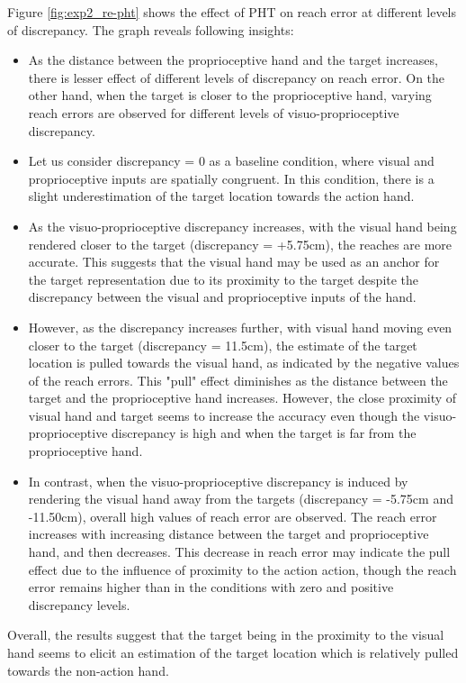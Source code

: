 Figure \ref{fig:exp2_re-pht} shows the effect of PHT on reach error at different levels of discrepancy. The graph reveals following insights:
\begin{itemize}

\item As the distance between the proprioceptive hand and the target increases, there is lesser effect of different levels of discrepancy on reach error. On the other hand, when the target is closer to the proprioceptive hand, varying reach errors are observed for different levels of visuo-proprioceptive discrepancy. 

\item Let us consider discrepancy = 0 as a baseline condition, where visual and proprioceptive inputs are spatially congruent. In this condition, there is a slight underestimation of the target location towards the action hand. 

\item As the visuo-proprioceptive discrepancy increases, with the visual hand being rendered closer to the target (discrepancy = +5.75cm), the reaches are more accurate. This suggests that the visual hand may be used as an anchor for the target representation due to its proximity to the target despite the discrepancy between the visual and proprioceptive inputs of the hand.

\item However, as the discrepancy increases further, with visual hand moving even closer to the target (discrepancy = 11.5cm), the estimate of the target location is pulled towards the visual hand, as indicated by the negative values of the reach errors. This "pull" effect diminishes as the distance between the target and the proprioceptive hand increases. However, the close proximity of visual hand and target seems to increase the accuracy even though the visuo-proprioceptive discrepancy is high and when the target is far from the proprioceptive hand.

\item In contrast, when the visuo-proprioceptive discrepancy is induced by rendering the visual hand away from the targets (discrepancy = -5.75cm and -11.50cm), overall high values of reach error are observed. The reach error increases with increasing distance between the target and proprioceptive hand, and then decreases. This decrease in reach error may indicate the pull effect due to the influence of proximity to the action action, though the reach error remains higher than in the conditions with zero and positive discrepancy levels. 

\end{itemize}

%
%

Overall, the results suggest that the target being in the proximity to the visual hand seems to elicit an estimation of the target location which is relatively pulled towards the non-action hand.







